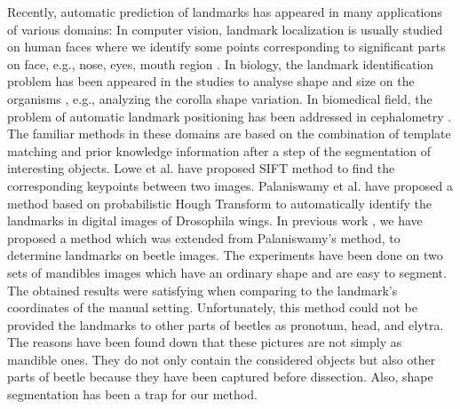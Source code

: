 \documentclass[review]{elsarticle}
\begin{document}
Recently, automatic prediction of landmarks has appeared in many applications of various domains: In computer vision, landmark localization is usually studied on human faces where we identify some points corresponding to significant parts on face, e.g., nose, eyes, mouth region \cite{burgos2013robust, yang2013sieving}. In biology, the landmark identification problem has been appeared in the studies to analyse shape and size on the organisms \cite{palaniswamy2010automatic, savriama2018step}, e.g., analyzing the corolla shape variation. In biomedical field, the problem of automatic landmark positioning has been addressed in cephalometry \cite{grau2001automatic, mohseni2007automatic}. The familiar methods in these domains are based on the combination of template matching and prior knowledge information after a step of the segmentation of interesting objects. Lowe et al. \cite{lowe2004distinctive} have proposed SIFT method to find the corresponding keypoints between two images. Palaniswamy et al. \cite{palaniswamy2010automatic} have proposed a method based on probabilistic Hough Transform to automatically identify the landmarks in digital images of Drosophila wings. In previous work \cite{le2017maelab}, we have proposed a method which was extended from Palaniswamy's method, to determine landmarks on beetle images. The experiments have been done on two sets of mandibles images which have an ordinary shape and are easy to segment. The obtained results were satisfying when comparing to the landmark's coordinates of the manual setting. Unfortunately, this method could not be provided the landmarks to other parts of beetles as pronotum, head, and elytra. The reasons have been found down that these pictures are not simply as mandible ones. They do not only contain the considered objects but also other parts of beetle because they have been captured before dissection. Also, shape segmentation has been a trap for our method.
\end{document}
